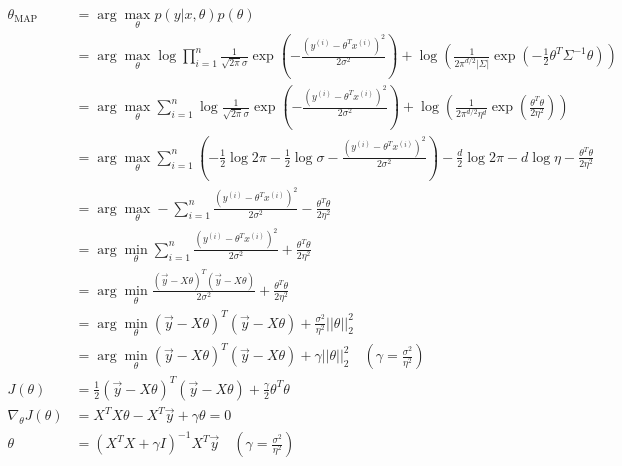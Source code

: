\begin{answer}
    $$
    \begin{aligned}
        \theta_{\text{MAP}} 
        &=\arg\max_\theta p(y|x, \theta) p(\theta)\\
        &=\arg\max_\theta\log{\prod_{i=1}^n \frac{1}{\sqrt{2\pi}\sigma}\exp{\left(-\frac{(y^{(i)} - \theta^Tx^{(i)})^2}{2\sigma^2} \right)}} + \log{\left(\frac{1}{2\pi^{d/2}|\Sigma|}\exp{(-\frac{1}{2}\theta^T\Sigma^{-1}\theta)}\right)}\\
        &=\arg\max_\theta\sum_{i=1}^n\log{\frac{1}{\sqrt{2\pi}\sigma}\exp{\left(-\frac{(y^{(i)} - \theta^Tx^{(i)})^2}{2\sigma^2} \right)}} + \log{\left(\frac{1}{2\pi^{d/2}\eta^d}\exp{(\frac{\theta^T\theta}{2\eta^2})}\right)}\\
        &=\arg\max_\theta\sum_{i=1}^n\left( -\frac{1}{2}\log{2\pi} - \frac{1}{2}\log{\sigma} -\frac{(y^{(i)} - \theta^Tx^{(i)})^2}{2\sigma^2}\right) - \frac{d}{2}\log{2\pi}- d\log{\eta} - \frac{\theta^T\theta}{2\eta^2}\\
        &=\arg\max_\theta -\sum_{i=1}^n\frac{(y^{(i)} - \theta^Tx^{(i)})^2}{2\sigma^2} - \frac{\theta^T\theta}{2\eta^2}\\
        &=\arg\min_\theta \sum_{i=1}^n\frac{(y^{(i)} - \theta^Tx^{(i)})^2}{2\sigma^2} + \frac{\theta^T\theta}{2\eta^2}\\
        &=\arg\min_\theta \frac{(\vec{y} - X\theta)^T(\vec{y} - X\theta)}{2\sigma^2} + \frac{\theta^T\theta}{2\eta^2}\\
        &=\arg\min_\theta (\vec{y} - X\theta)^T(\vec{y} - X\theta) + \frac{\sigma^2}{\eta^2}||\theta||_2^2 \\
        &=\arg\min_\theta (\vec{y} - X\theta)^T(\vec{y} - X\theta) + \gamma||\theta||_2^2 \quad (\gamma = \frac{\sigma^2}{\eta^2})\\
        J(\theta) &= \frac{1}{2}{(\vec{y} - X\theta)^T(\vec{y} - X\theta)} +  \frac{\gamma}{2}{\theta^T\theta} \\
        \nabla_\theta J(\theta) &= X^TX\theta-X^T\vec{y} + \gamma\theta = 0 \\
        \theta &= (X^TX + \gamma I)^{-1}X^T\vec{y} \quad (\gamma = \frac{\sigma^2}{\eta^2})
    \end{aligned}
    $$
\end{answer}
